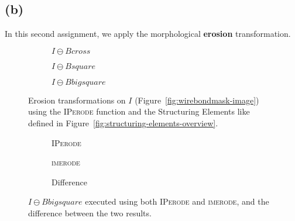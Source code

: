 \documentclass{article}
\begin{document}
\subsection*{(b)} In this second assignment, we apply the morphological \textbf{erosion} transformation. 

\begin{figure}[H]
     \centering
     \begin{subfigure}[b]{0.3\textwidth}
         \centering
         
         \caption{$I \ominus Bcross$}
         \label{fig:wirebondmask_Bcross_eroded}
     \end{subfigure}
     \hfill
     \begin{subfigure}[b]{0.3\textwidth}
         \centering
         
         \caption{$I \ominus Bsquare$}
         \label{fig:wirebondmask_Bsquare_eroded}
     \end{subfigure}
     \hfill
     \begin{subfigure}[b]{0.3\textwidth}
         \centering
         
         \caption{$I \ominus Bbigsquare$}
         \label{fig:wirebondmask_Bbigsquare_eroded}
     \end{subfigure}
     
    \caption{Erosion transformations on $I$ (Figure~\ref{fig:wirebondmask-image}) using the \textsc{IPerode} function and the Structuring Elements like defined in Figure~\ref{fig:structuring-elements-overview}.}
    \label{fig:wirebondmask_eroded}
\end{figure}

\begin{figure}[H]
     \centering
     \begin{subfigure}[b]{0.3\textwidth}
         \centering
         
         \caption{\textsc{IPerode}}
         \label{fig:wirebondmask_Bbigsquare_IPerode}
     \end{subfigure}
     \hfill
     \begin{subfigure}[b]{0.3\textwidth}
         \centering
         
         \caption{\textsc{imerode}}
         \label{fig:wirebondmask_Bbigsquare_imerode}
     \end{subfigure}
     \hfill
     \begin{subfigure}[b]{0.3\textwidth}
         \centering
         
         \caption{Difference}
         \label{fig:wirebondmask_Bbigsquare_erode_diff}
     \end{subfigure}
     
    \caption{$I \ominus Bbigsquare$ executed using both \textsc{IPerode} and \textsc{imerode}, and the difference between the two results.}
    \label{fig:wirebondmask_erode_diff}
\end{figure}
\end{document}
